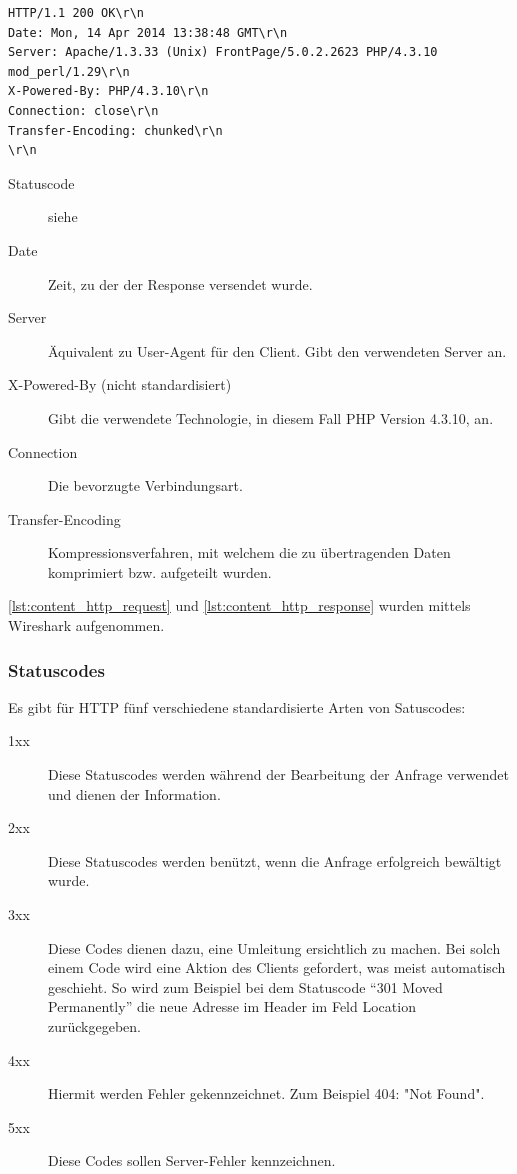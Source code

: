 \begin{lstlisting}[style=custom, caption={HTTP-Response},label={lst:content_http_response}]
HTTP/1.1 200 OK\r\n
Date: Mon, 14 Apr 2014 13:38:48 GMT\r\n
Server: Apache/1.3.33 (Unix) FrontPage/5.0.2.2623 PHP/4.3.10 mod_perl/1.29\r\n
X-Powered-By: PHP/4.3.10\r\n
Connection: close\r\n
Transfer-Encoding: chunked\r\n
\r\n
\end{lstlisting}
\begin{description}
\item[Statuscode] siehe 
\item[Date] Zeit, zu der der Response versendet wurde.
\item[Server] Äquivalent zu User-Agent für den Client. Gibt den verwendeten Server an. 
\item[X-Powered-By (nicht standardisiert)] Gibt die verwendete Technologie, in diesem Fall PHP Version 4.3.10, an. 
\item[Connection] Die bevorzugte Verbindungsart.
\item[Transfer-Encoding] Kompressionsverfahren, mit welchem die zu übertragenden Daten komprimiert bzw. aufgeteilt wurden.
\end{description}
\autoref{lst:content_http_request} und \autoref{lst:content_http_response} wurden mittels Wireshark aufgenommen.
\subsubsection{Statuscodes}
\label{sec:content_http_statuscodes}
Es gibt für HTTP fünf verschiedene standardisierte Arten von Satuscodes:\textsl{}
\begin{description}
\item[1xx] Diese Statuscodes werden während der Bearbeitung der Anfrage verwendet und dienen der Information.
\item[2xx] Diese Statuscodes werden benützt, wenn die Anfrage erfolgreich bewältigt wurde.  
\item[3xx] Diese Codes dienen dazu, eine Umleitung ersichtlich zu machen. Bei solch einem Code wird eine Aktion des Clients gefordert, was meist automatisch geschieht. So wird zum Beispiel bei dem Statuscode \enquote{301 Moved Permanently} die neue Adresse im Header im Feld Location zurückgegeben.
\item[4xx] Hiermit werden Fehler gekennzeichnet. Zum Beispiel 404: "Not Found".
\item[5xx] Diese Codes sollen Server-Fehler kennzeichnen.
\end{description}

